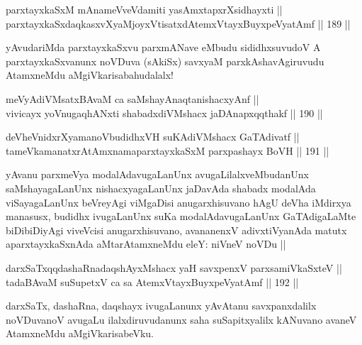 \begin{shl}
parxtayxkaSxM mAnameVveVdamiti yasAmxtapxrXsidhayxti || \\
parxtayxkaSxdaqkasxvXyaMjoyxVtisatxdAtemxVtayxBuyxpeVyatAmf ||  189 ||  
\end{shl}

\begin{artha}
yAvudariMda parxtayxkaSxvu parxmANave eMbudu sididhxsuvudoV A parxtayxkaSxvanunx noVDuva (sAkiSx) savxyaM parxkAshavAgiruvudu AtamxneMdu aMgiVkarisabahudalalx! 
\end{artha}

\begin{shl}
meVyAdiVMsatxBAvaM ca saMshayAnaqtanishacxyAnf || \\
vivicayx yoV\s nugaqhANxti shabadxdiVMshacx jaDAnapxqqthakf ||  190 ||  
\end{shl}

\begin{shl}
deVheVnidxrXyamanoVbudidhxVH suKAdiVMshacx GaTAdivatf || \\
tameVkamanatxrAtAmxnamaparxtayxkaSxM parxpashayx BoVH ||  191 ||  
\end{shl}

\begin{artha}
yAvanu parxmeVya modalAdavugaLanUnx avugaLilalxveMbudanUnx saMshayagaLanUnx nishacxyagaLanUnx jaDavAda shabadx modalAda viSayagaLanUnx beVreyAgi viMgaDisi anugarxhisuvano hAgU deVha iMdirxya manasusx, budidhx ivugaLanUnx suKa modalAdavugaLanUnx GaTAdigaLaMte biDibiDiyAgi viveVcisi anugarxhisuvano, avananenxV adivxtiVyanAda matutx aparxtayxkaSxnAda aMtarAtamxneMdu eleY: niVneV noVDu ||
\end{artha}

\begin{shl}
darxSaTxqqdashaRnadaqshAyxMshacx yaH savxpenxV parxsamiVkaSxteV || \\
tadaBAvaM suSupetxV ca sa AtemxVtayxBuyxpeVyatAmf ||  192 ||  
\end{shl}

\begin{artha}
darxSaTx, dashaRna, daqshayx ivugaLanunx yAvAtanu savxpanxdalilx noVDuvanoV avugaLu ilalxdiruvudanunx saha suSapitxyalilx kANuvano avaneV AtamxneMdu aMgiVkarisabeVku.
\end{artha}
